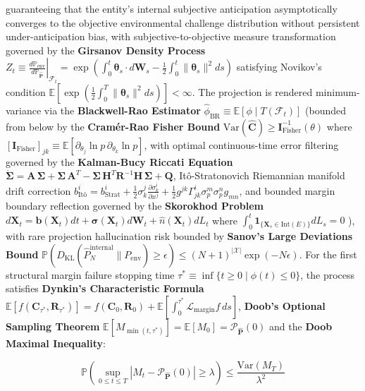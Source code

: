 \documentclass[11pt,a4paper]{article}
\theoremstyle{definition}
\theoremstyle{remark}
\begin{document}
guaranteeing that the entity's internal subjective anticipation asymptotically converges to the objective environmental challenge distribution without persistent under-anticipation bias, with subjective-to-objective measure transformation governed by the \textbf{Girsanov Density Process} $Z_t \equiv \left.\frac{d\mathbb{P}_{\text{env}}}{d\mathbb{P}_{\hat{\mathbf{P}}}}\right|_{\mathcal{F}_t} = \exp\left( \int_0^t \boldsymbol{\theta}_s \cdot d\mathbf{W}_s - \frac{1}{2}\int_0^t \|\boldsymbol{\theta}_s\|^2 ds \right)$ satisfying Novikov's condition $\mathbb{E}[\exp(\frac{1}{2}\int_0^T \|\boldsymbol{\theta}_s\|^2 ds)] < \infty$. The projection is rendered minimum-variance via the \textbf{Blackwell-Rao Estimator} $\hat{\phi}_{\text{BR}} \equiv \mathbb{E}[\phi \mid T(\mathcal{F}_t)]$ (bounded from below by the \textbf{Cramér-Rao Fisher Bound} $\mathrm{Var}(\hat{\mathbf{C}}) \ge \mathbf{I}_{\text{Fisher}}^{-1}(\theta)$ where $[\mathbf{I}_{\text{Fisher}}]_{jk} \equiv \mathbb{E}[\partial_{\theta_j}\ln p \, \partial_{\theta_k}\ln p]$, with optimal continuous-time error filtering governed by the \textbf{Kalman-Bucy Riccati Equation} $\dot{\mathbf{\Sigma}} = \mathbf{A} \, \mathbf{\Sigma} + \mathbf{\Sigma} \, \mathbf{A}^T - \mathbf{\Sigma} \, \mathbf{H}^T\mathbf{R}^{-1}\mathbf{H} \, \mathbf{\Sigma} + \mathbf{Q}$, Itô-Stratonovich Riemannian manifold drift correction $b^i_{\text{It\^o}} = b^i_{\text{Strat}} + \frac{1}{2}\sigma^j_k \frac{\partial \sigma^i_k}{\partial x^j} + \frac{1}{2}g^{jk}\Gamma^i_{jk}\sigma^m_p \sigma^n_p g_{mn}$, and bounded margin boundary reflection governed by the \textbf{Skorokhod Problem} $d\mathbf{X}_t = \mathbf{b}(\mathbf{X}_t)dt + \boldsymbol{\sigma}(\mathbf{X}_t)d\mathbf{W}_t + \hat{n}(\mathbf{X}_t)dL_t$ where $\int_0^t \mathbf{1}_{\{\mathbf{X}_s \in \mathrm{Int}(E)\}}dL_s = 0$ ), with rare projection hallucination risk bounded by \textbf{Sanov's Large Deviations Bound} $\mathbb{P}(D_{\text{KL}}(\hat{P}_N^{\text{internal}} \parallel P_{\text{env}}) \ge \epsilon) \le (N+1)^{|\mathcal{X}|} \exp(-N\epsilon)$. For the first structural margin failure stopping time $\tau^* \equiv \inf\{ t \ge 0 \mid \phi(t) \le 0 \}$, the process satisfies \textbf{Dynkin's Characteristic Formula} $\mathbb{E}[f(\mathbf{C}_{\tau^*}, \mathbf{R}_{\tau^*})] = f(\mathbf{C}_0, \mathbf{R}_0) + \mathbb{E}[\int_0^{\tau^*} \mathcal{L}_{\text{margin}} f \, ds]$, \textbf{Doob's Optional Sampling Theorem} $\mathbb{E}[M_{\min(t, \tau^*)}] = \mathbb{E}[M_0] = \mathcal{P}_{\hat{\mathbf{P}}}(0)$ and the \textbf{Doob Maximal Inequality}:


\begin{equation}
\boxed{\mathbb{P}\left( \sup_{0 \le t \le T} \left| M_t - \mathcal{P}_{\hat{\mathbf{P}}}(0) \right| \ge \lambda \right) \le \frac{\mathrm{Var}(M_T)}{\lambda^2}}
\end{equation}
\end{document}
